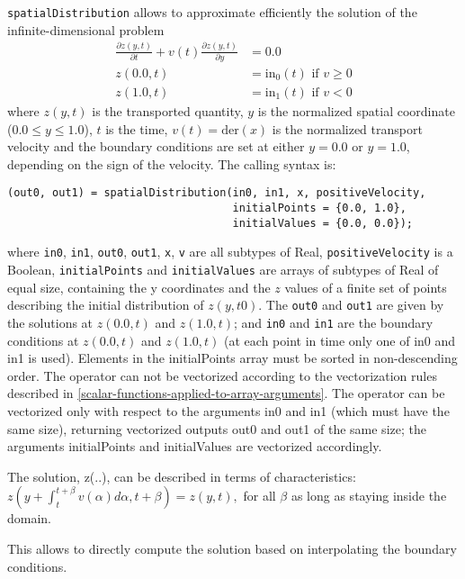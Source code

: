 \lstinline!spatialDistribution! allows to approximate efficiently the solution of the infinite-dimensional problem
\begin{align*}
\frac{\partial z(y,t)}{\partial t}+v(t)\frac{\partial z(y,t)}{\partial y} &= 0.0\\
z(0.0, t) &= \mathrm{in}_0(t) \text{ if $v\ge 0$}\\
z(1.0, t) &= \mathrm{in}_1(t) \text{ if $v<0$}
\end{align*}
where $z(y, t)$ is the transported quantity, $y$ is the
normalized spatial coordinate ($0.0 \le y \le 1.0$), $t$ is the
time, $v(t)=\mathrm{der}(x)$ is the normalized
transport velocity and the boundary conditions are set at either
$y=0.0$ or $y=1.0$, depending on the sign of the velocity.
The calling syntax is:
\begin{lstlisting}[language=modelica]
(out0, out1) = spatialDistribution(in0, in1, x, positiveVelocity,
                                   initialPoints = {0.0, 1.0},
                                   initialValues = {0.0, 0.0});
\end{lstlisting}
where \lstinline!in0!, \lstinline!in1!, \lstinline!out0!, \lstinline!out1!, \lstinline!x!, \lstinline!v! are all subtypes of Real,
\lstinline!positiveVelocity! is a Boolean, \lstinline!initialPoints! and \lstinline!initialValues! are
arrays of subtypes of Real of equal size, containing the y coordinates
and the $z$ values of a finite set of points describing the initial
distribution of $z(y, \mathit{t0})$. The \lstinline!out0! and \lstinline!out1! are given by
the solutions at $z(0.0, t)$ and $z(1.0, t)$; and \lstinline!in0! and \lstinline!in1!
are the boundary conditions at $z(0.0, t)$ and $z(1.0, t)$ (at
each point in time only one of in0 and in1 is used). Elements in the
initialPoints array must be sorted in non-descending order. The operator
can not be vectorized according to the vectorization rules described in
\autoref{scalar-functions-applied-to-array-arguments}. The operator can be vectorized only with respect to the
arguments in0 and in1 (which must have the same size), returning
vectorized outputs out0 and out1 of the same size; the arguments
initialPoints and initialValues are vectorized accordingly.

The solution, z(..), can be described in terms of characteristics:\\
$z(y+\int_t^{t+\beta}v(\alpha)d\alpha,t+\beta)=z(y,t),$ for all $\beta$ as long as staying inside the domain.

This allows to directly compute the solution based on interpolating the
boundary conditions.

